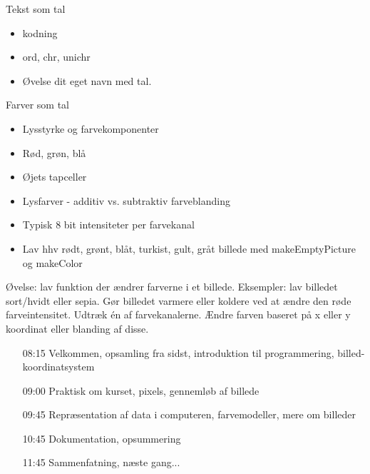 \documentclass[a4paper,landscape]{slides}
\begin{document}
\begin{slide}
	\begin{center} {\large 
            Tekst som tal
	} \end{center}
	\begin{itemize} \addtolength{\itemsep}{-\baselineskip}
            \item kodning
            \item ord, chr, unichr
            \item Øvelse dit eget navn med tal.
	\end{itemize}
\end{slide}

\begin{slide}
	\begin{center} {\large 
            Farver som tal
	} \end{center}
	\begin{itemize} \addtolength{\itemsep}{-\baselineskip}
		\item Lysstyrke og farvekomponenter
		\item Rød, grøn, blå
		\item Øjets tapceller
		\item Lysfarver - additiv vs. subtraktiv farveblanding
		\item Typisk 8 bit intensiteter per farvekanal
		\item Lav hhv rødt, grønt, blåt, turkist, gult, gråt billede med makeEmptyPicture og makeColor
	\end{itemize}
\end{slide}

\begin{slide}
	\begin{center} {\large 
            Øvelse: lav funktion der ændrer farverne i et billede. Eksempler: lav billedet sort/hvidt eller sepia. Gør billedet varmere eller koldere ved at ændre den røde farveintensitet. Udtræk én af farvekanalerne. Ændre farven baseret på x eller y koordinat eller blanding af disse.
	} \end{center}
	\begin{itemize} \addtolength{\itemsep}{-\baselineskip}
    		\item[08:15] Velkommen, opsamling fra sidst, introduktion til programmering, billed-koordinatsystem
    		\item[09:00] Praktisk om kurset, pixels, gennemløb af billede
    		\item[09:45] Repræsentation af data i computeren, farvemodeller, mere om billeder
    		\item[10:45] Dokumentation, opsummering
    		\item[11:45] Sammenfatning, næste gang...
	\end{itemize}
\end{slide}
\end{document}
